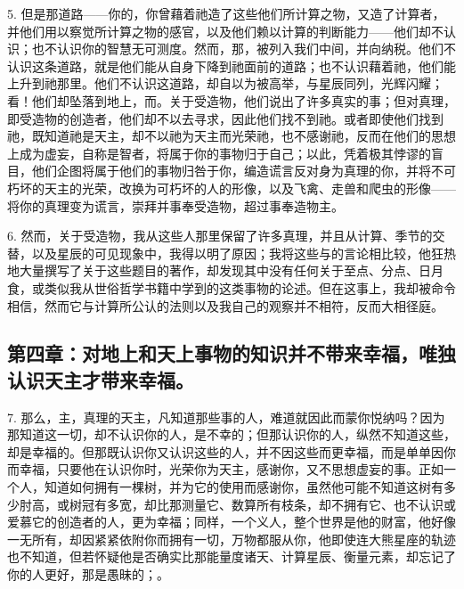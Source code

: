 5. 但是那道路——你的，你曾藉着祂造了这些他们所计算之物，又造了计算者，并他们用以察觉所计算之物的感官，以及他们赖以计算的判断能力——他们却不认识；也不认识你的智慧无可测度。然而，那，被列入我们中间，并向纳税。他们不认识这条道路，就是他们能从自身下降到祂面前的道路；也不认识藉着祂，他们能上升到祂那里。他们不认识这道路，却自以为被高举，与星辰同列，光辉闪耀；看！他们却坠落到地上，而。关于受造物，他们说出了许多真实的事；但对真理，即受造物的创造者，他们却不以去寻求，因此他们找不到祂。或者即使他们找到祂，既知道祂是天主，却不以祂为天主而光荣祂，也不感谢祂，反而在他们的思想上成为虚妄，自称是智者，将属于你的事物归于自己；以此，凭着极其悖谬的盲目，他们企图将属于他们的事物归咎于你，编造谎言反对身为真理的你，并将不可朽坏的天主的光荣，改换为可朽坏的人的形像，以及飞禽、走兽和爬虫的形像——将你的真理变为谎言，崇拜并事奉受造物，超过事奉造物主。\par

6. 然而，关于受造物，我从这些人那里保留了许多真理，并且从计算、季节的交替，以及星辰的可见现象中，我得以明了原因；我将这些与的言论相比较，他狂热地大量撰写了关于这些题目的著作，却发现其中没有任何关于至点、分点、日月食，或类似我从世俗哲学书籍中学到的这类事物的论述。但在这事上，我却被命令相信，然而它与计算所公认的法则以及我自己的观察并不相符，反而大相径庭。\par


\subsection{第四章：对地上和天上事物的知识并不带来幸福，唯独认识天主才带来幸福。}

7. 那么，主，真理的天主，凡知道那些事的人，难道就因此而蒙你悦纳吗？因为那知道这一切，却不认识你的人，是不幸的；但那认识你的人，纵然不知道这些，却是幸福的。但那既认识你又认识这些的人，并不因这些而更幸福，而是单单因你而幸福，只要他在认识你时，光荣你为天主，感谢你，又不思想虚妄的事。正如一个人，知道如何拥有一棵树，并为它的使用而感谢你，虽然他可能不知道这树有多少肘高，或树冠有多宽，却比那测量它、数算所有枝条，却不拥有它、也不认识或爱慕它的创造者的人，更为幸福；同样，一个义人，整个世界是他的财富，他好像一无所有，却因紧紧依附你而拥有一切，万物都服从你，他即使连大熊星座的轨迹也不知道，但若怀疑他是否确实比那能量度诸天、计算星辰、衡量元素，却忘记了你的人更好，那是愚昧的；。\par

